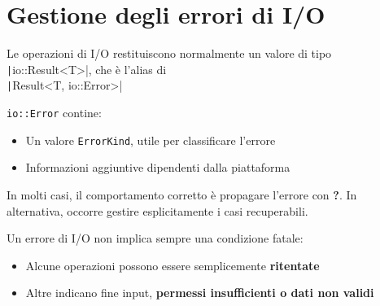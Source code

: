 \section{Gestione degli errori di I/O}

Le operazioni di I/O restituiscono normalmente un valore di tipo \texttt|io::Result<T>|, che
è l'alias di \\
\texttt|Result<T, io::Error>|

\verb|io::Error| contine:

\begin{itemize}
  \item Un valore \verb|ErrorKind|, utile per classificare l'errore
  \item Informazioni aggiuntive dipendenti dalla piattaforma
\end{itemize}

In molti casi, il comportamento corretto è propagare l'errore con \textbf{?}.
In alternativa, occorre gestire esplicitamente i casi recuperabili.


Un errore di I/O non implica sempre una condizione fatale:

\begin{itemize}
  \item Alcune operazioni possono essere semplicemente \textbf{ritentate}
  \item Altre indicano fine input, \textbf{permessi insufficienti o dati non validi}
\end{itemize}



